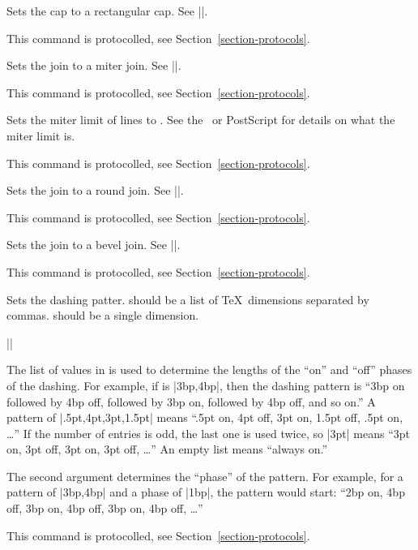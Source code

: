 \begin{command}{\pgfsys@rectcap}
  Sets the cap to a rectangular cap. See |\pgfsys@stroke|.

  This command is protocolled, see Section~\ref{section-protocols}.
\end{command}

\begin{command}{\pgfsys@miterjoin}
  Sets the join to a miter join. See |\pgfsys@stroke|.

  This command is protocolled, see Section~\ref{section-protocols}.
\end{command}

\begin{command}{\pgfsys@setmiterlimit{}}
  Sets the miter limit of lines to . See
  the \pdf\ or PostScript for details on what the miter limit is.

  This command is protocolled, see Section~\ref{section-protocols}.
\end{command}

\begin{command}{\pgfsys@roundjoin}
  Sets the join to a round join. See |\pgfsys@stroke|.

  This command is protocolled, see Section~\ref{section-protocols}.
\end{command}

\begin{command}{\pgfsys@beveljoin}
  Sets the join to a bevel join. See |\pgfsys@stroke|.

  This command is protocolled, see Section~\ref{section-protocols}.
\end{command}

\begin{command}{\pgfsys@setdash{}}
  Sets the dashing patter.  should be a list of \TeX\
  dimensions separated by commas.  should be a
  single dimension.

  \example |\pgfsys@setdash{3pt,3pt}{0pt}|

  The list of values in  is used to determine the
  lengths of the ``on'' and ``off'' phases of the dashing. For example, if  is |3bp,4bp|, then the dashing
  pattern is ``3bp on followed by 4bp off, followed by 3bp on,
  followed by 4bp off, and so on.'' A pattern of |.5pt,4pt,3pt,1.5pt| means
  ``.5pt on, 4pt off, 3pt on, 1.5pt off, .5pt on, \dots'' If the
  number of entries is odd, the last one is used twice, so |3pt| means
  ``3pt on, 3pt off, 3pt on, 3pt off, \dots'' An empty list
  means  ``always on.''

  The second argument determines the ``phase'' of the pattern. For
  example, for a pattern of |3bp,4bp| and a phase of |1bp|, the pattern
  would start: ``2bp on, 4bp off, 3bp on, 4bp off, 3bp on, 4bp off,
  \dots''

  This command is protocolled, see Section~\ref{section-protocols}.
\end{command}

